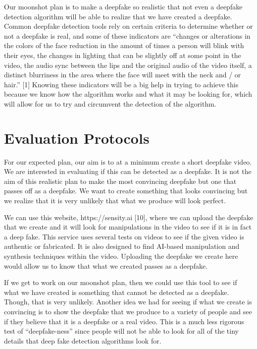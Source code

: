 \documentclass{article}
\begin{document}
Our moonshot plan is to make a deepfake so realistic that not even a deepfake detection algorithm will be able to realize that we have created a deepfake. Common deepfake detection tools rely on certain criteria to determine whether or not a deepfake is real, and some of these indicators are “changes or alterations in the colors of the face reduction in the amount of times a person will blink with their eyes, the changes in lighting that can be slightly off at some point in the video, the audio sync between the lips and the original audio of the video itself, a distinct blurriness in the area where the face will meet with the neck and / or hair.” [1] Knowing these indicators will be a big help in trying to achieve this because we know how the algorithm works and what it may be looking for, which will allow for us to try and circumvent the detection of the algorithm. 


\section{Evaluation Protocols}

For our expected plan, our aim is to at a minimum create a short deepfake video. We are interested in evaluating if this can be detected as a deepfake. It is not the aim of this realistic plan to make the most convincing deepfake but one that passes off as a deepfake. We want to create something that looks convincing but we realize that it is very unlikely that what we produce will look perfect.

We can use this website, https://sensity.ai [10], where we can upload the deepfake that we create and it will look for manipulations in the video to see if it is in fact a deep fake. This service uses several tests on videos to see if the given video is authentic or fabricated. It is also designed to find AI-based manipulation and synthesis techniques within the video. Uploading the deepfake we create here would allow us to know that what we created passes as a deepfake.

If we get to work on our moonshot plan, then we could use this tool to see if what we have created is something that cannot be detected as a deepfake. Though, that is very unlikely. 
Another idea we had for seeing if what we create is convincing is to show the deepfake that we produce to a variety of people and see if they believe that it is a deepfake or a real video. This is a much less rigorous test of “deepfake-ness” since people will not be able to look for all of the tiny details that deep fake detection algorithms look for.
\end{document}
